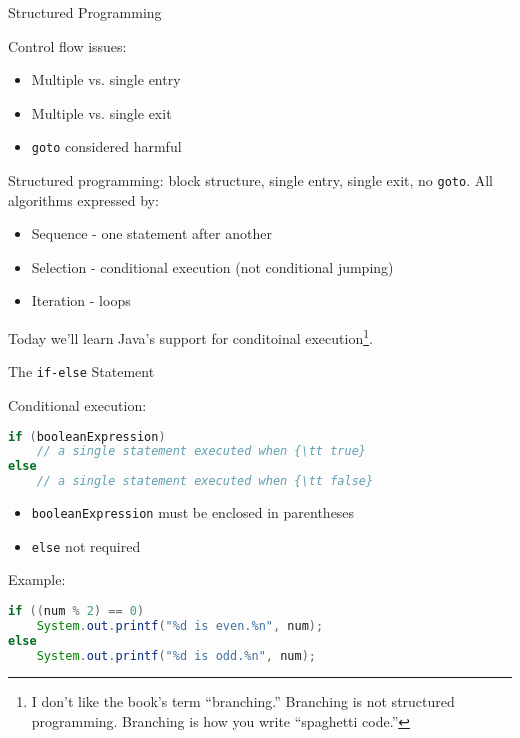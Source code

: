 \documentclass{beamer}
\author[Chris Simpkins] 
{Christopher Simpkins \\\texttt{chris.simpkins@gatech.edu}}
\institute[Georgia Tech] %
\date[CS 1331]{}
\title[\course] %
{\lesson}
\subtitle{}
\begin{document}
\begin{frame}
  \titlepage
\end{frame}

\begin{frame}{Structured Programming}


Control flow issues:
\begin{itemize}
\item Multiple vs. single entry
\item Multiple vs. single exit
\item {\tt goto} considered harmful
\end{itemize}

Structured programming: block structure, single entry, single exit, no {\tt goto}.  All algorithms expressed by:
\begin{itemize}
\item Sequence - one statement after another
\item Selection - conditional execution (not conditional jumping)
\item Iteration - loops
\end{itemize}

Today we'll learn Java's support for conditoinal execution\footnote{I
  don't like the book's term ``branching.''  Branching is not
  structured programming.  Branching is how you write ``spaghetti code.''}.

\end{frame}

\begin{frame}[fragile]{The {\tt if-else} Statement}


Conditional execution:
\begin{lstlisting}[language=Java]
if (booleanExpression)
    // a single statement executed when {\tt true}
else
    // a single statement executed when {\tt false}
\end{lstlisting}
\vspace{-.1in}
\begin{itemize}
\item {\tt booleanExpression} must be enclosed in parentheses
\item {\tt else} not required
\end{itemize}
\vspace{-.1in}
Example:
\begin{lstlisting}[language=Java]
if ((num % 2) == 0)
    System.out.printf("%d is even.%n", num);
else
    System.out.printf("%d is odd.%n", num);
\end{lstlisting}

\end{frame}
\end{document}
